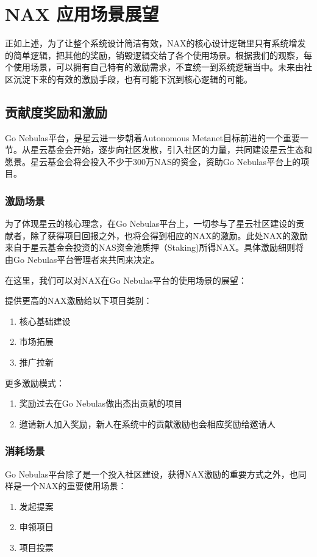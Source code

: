 \section{NAX 应用场景展望}
正如上述，为了让整个系统设计简洁有效，NAX的核心设计逻辑里只有系统增发的简单逻辑，把其他的奖励，销毁逻辑交给了各个使用场景。根据我们的观察，每个使用场景，可以拥有自己特有的激励需求，不宜统一到系统逻辑当中。未来由社区沉淀下来的有效的激励手段，也有可能下沉到核心逻辑的可能。

\subsection{贡献度奖励和激励}
Go Nebulas平台，是星云进一步朝着Autonomous Metanet目标前进的一个重要一节。从星云基金会开始，逐步向社区发散，引入社区的力量，共同建设星云生态和愿景。星云基金会将会投入不少于300万NAS的资金，资助Go Nebulas平台上的项目。

\subsubsection{激励场景}
为了体现星云的核心理念，在Go Nebulas平台上，一切参与了星云社区建设的贡献者，除了获得项目回报之外，也将会得到相应的NAX的激励。此处NAX的激励来自于星云基金会投资的NAS资金池质押（Staking)所得NAX。具体激励细则将由Go Nebulas平台管理者来共同来决定。

在这里，我们可以对NAX在Go Nebulas平台的使用场景的展望：

提供更高的NAX激励给以下项目类别：
\begin{enumerate}
  \item 核心基础建设
  \item 市场拓展
  \item 推广拉新
\end{enumerate}

更多激励模式：
\begin{enumerate}
  \item 奖励过去在Go Nebulas做出杰出贡献的项目
  \item 邀请新人加入奖励，新人在系统中的贡献激励也会相应奖励给邀请人
\end{enumerate}

\subsubsection{消耗场景}
Go Nebulas平台除了是一个投入社区建设，获得NAX激励的重要方式之外，也同样是一个NAX的重要使用场景：
\begin{enumerate}
  \item 发起提案
  \item 申领项目
  \item 项目投票
\end{enumerate}

